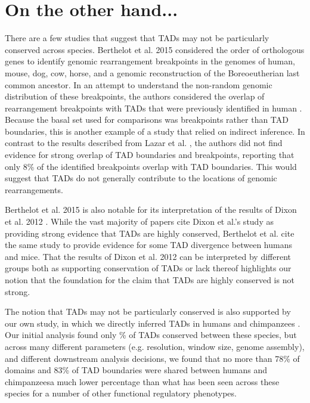 \section{On the other hand...}
There are a few studies that suggest that TADs may not be particularly conserved across species. Berthelot et al. 2015 \cite{Berthelot.2015} considered the order of orthologous genes to identify genomic rearrangement breakpoints in the genomes of human, mouse, dog, cow, horse, and a genomic reconstruction of the Boreoeutherian last common ancestor. In an attempt to understand the non-random genomic distribution of these breakpoints, the authors considered the overlap of rearrangement breakpoints with TADs that were previously identified in human \cite{Dixon.2012}. Because the basal set used for comparisons was breakpoints rather than TAD boundaries, this is another example of a study that relied on indirect inference. In contrast to the results described from Lazar et al. \cite{Lazar.2018}, the authors did not find evidence for strong overlap of TAD boundaries and breakpoints, reporting that only 8\% of the identified breakpoints overlap with TAD boundaries. This would suggest that TADs do not generally contribute to the locations of genomic rearrangements.

Berthelot et al. 2015 \cite{Berthelot.2015} is also notable for its interpretation of the results of Dixon et al. 2012 \cite{Dixon.2012}. While the vast majority of papers cite Dixon et al.'s study as providing strong evidence that TADs are highly conserved, Berthelot et al. cite the same study to provide evidence for some TAD divergence between humans and mice. That the results of Dixon et al. 2012 can be interpreted by different groups both as supporting conservation of TADs or lack thereof highlights our notion that the foundation for the claim that TADs are highly conserved is not strong.

The notion that TADs may not be particularly conserved is also supported by our own study, in which we directly inferred TADs in humans and chimpanzees \cite{Eres.2019}. Our initial analysis found only \% of TADs conserved between these species, but across many different parameters (e.g. resolution, window size, genome assembly), and different downstream analysis decisions, we found that no more than 78\% of domains and 83\% of TAD boundaries were shared between humans and chimpanzees{\textemdash}a much lower percentage than what has been seen across these species for a number of other functional regulatory phenotypes.

